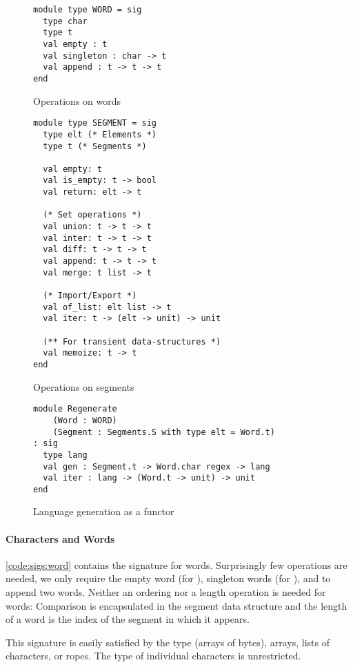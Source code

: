 \begin{figure}[tp]
  \centering
\begin{lstlisting}
module type WORD = sig
  type char
  type t
  val empty : t
  val singleton : char -> t
  val append : t -> t -> t
end
\end{lstlisting}
    \caption{Operations on words}
    \label{code:sigs:word}

\begin{lstlisting}
module type SEGMENT = sig
  type elt (* Elements *)
  type t (* Segments *)

  val empty: t
  val is_empty: t -> bool
  val return: elt -> t

  (* Set operations *)
  val union: t -> t -> t
  val inter: t -> t -> t
  val diff: t -> t -> t
  val append: t -> t -> t
  val merge: t list -> t

  (* Import/Export *)
  val of_list: elt list -> t
  val iter: t -> (elt -> unit) -> unit

  (** For transient data-structures *)
  val memoize: t -> t
end
\end{lstlisting}
    \caption{Operations on segments}
    \label{code:sigs:segment}
    
\begin{lstlisting}
module Regenerate
    (Word : WORD)
    (Segment : Segments.S with type elt = Word.t)
: sig
  type lang
  val gen : Segment.t -> Word.char regex -> lang
  val iter : lang -> (Word.t -> unit) -> unit
end
\end{lstlisting}
    \caption{Language generation as a functor}
    \label{code:sigs:regen}
\end{figure}

\paragraph{Characters and Words}

\autoref{code:sigs:word} contains the signature for words.
Surprisingly few operations are needed, we only require
the empty word (for ),
singleton words (for ), and to append two words.
Neither an ordering nor a length operation is needed for words:
Comparison is encapsulated in the segment
data structure and the length of a word is the index of the segment in
which it appears.

This signature is easily satisfied by the \ocaml {}
type (\ie arrays of bytes), arrays, lists of characters, or ropes. The
type of individual characters is unrestricted.

